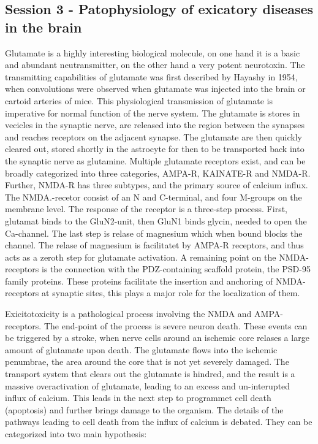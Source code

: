 \documentclass[12p]{article}
\begin{document}
\subsection*{Session 3 - Patophysiology of exicatory diseases in the brain}

Glutamate is a highly interesting biological molecule, on one hand it is a basic and abundant neutransmitter, on the other hand a very potent neurotoxin.
The transmitting capabilities of glutamate was first described by Hayashy in 1954, when convolutions were observed when glutamate was injected into the brain or cartoid arteries of mice.
This physiological transmission of glutamate is imperative for normal function of the nerve system.
The glutamate is stores in vecicles in the synaptic nerve, are released into the region between the synapses and reaches receptors on the adjacent synapse.
The glutamate are then quickly cleared out, stored shortly in the astrocyte for then to be transported back into the synaptic nerve as glutamine.
Multiple glutamate receptors exist, and can be broadly categorized into three categories, AMPA-R, KAINATE-R and NMDA-R.
Further, NMDA-R has three subtypes, and the primary source of calcium influx.
The NMDA.-recetor consist of an N and C-terminal, and four M-groups on the membrane level.
The response of the receptor is a three-step process.
First, glutamat binds to the GluN2-unit, then GluN1 binds glycin, needed to open the Ca-channel.
The last step is relase of magnesium which when bound blocks the channel.
The relase of magnesium is facilitatet by AMPA-R receptors, and thus acts as a zeroth step for glutamate activation.
A remaining point on the NMDA-receptors is the connection with the PDZ-containing scaffold protein, the PSD-95 family proteins.
These proteins facilitate the insertion and anchoring of NMDA-receptors at synaptic sites, this plays a major role for the localization of them.

Exicitotoxicity is a pathological process involving the NMDA and AMPA-receptors.
The end-point of the process is severe neuron death.
These events can be triggered by a stroke, when nerve cells around an ischemic core relases a large amount of glutamate upon death.
The glutamate flows into the ischemic penumbrae, the area around the core that is not yet severely damaged.
The transport system that clears out the glutamate is hindred, and the result is a massive overactivation of glutamate, leading to an excess and un-interupted influx of calcium.
This leads in the next step to programmet cell death (apoptosis) and further brings damage to the organism.
The details of the pathways leading to cell death from the influx of calcium is debated.
They can be categorized into two main hypothesis:
\end{document}
